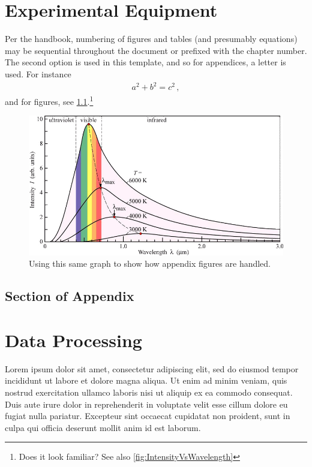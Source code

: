 \begin{appendices}



\chapter{Experimental Equipment}
Per the handbook, numbering of figures and tables (and presumably equations) may be sequential throughout the document or prefixed with the chapter number.
The second option is used in this template, and so for appendices, a letter is used. 
For instance
\begin{align}
  a^{2} + b^{2} = c^{2}\,,
\end{align}
and for figures, see \cref{fig:AppendixTestFigure}.\footnote{%
Does it look familiar?
See also \cref{fig:IntensityVsWavelength}
}

\begin{figure}
  \centering
  \includegraphics[width=0.75\linewidth]{figures/exampleFigure.png}
  \caption[The same damn figure]{Using this same graph to show how appendix figures are handled.}
  \label{fig:AppendixTestFigure}
\end{figure}

\section{Section of Appendix}

\chapter{Data Processing}
Lorem ipsum dolor sit amet, consectetur adipiscing elit, sed do eiusmod tempor incididunt ut labore et dolore magna aliqua. Ut enim ad minim veniam, quis nostrud exercitation ullamco laboris nisi ut aliquip ex ea commodo consequat. Duis aute irure dolor in reprehenderit in voluptate velit esse cillum dolore eu fugiat nulla pariatur. Excepteur sint occaecat cupidatat non proident, sunt in culpa qui officia deserunt mollit anim id est laborum.

\end{appendices}